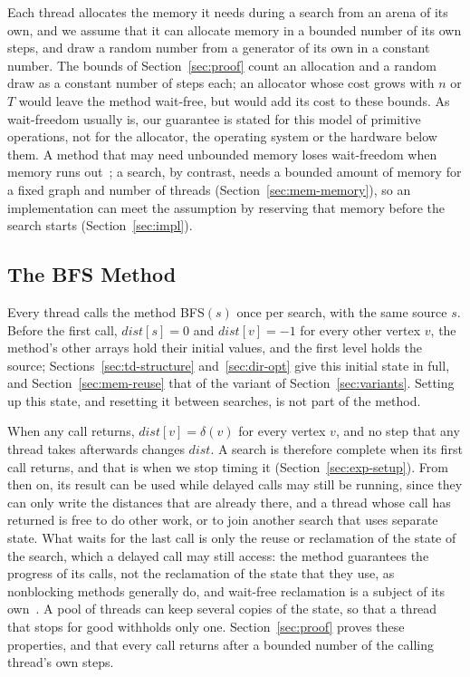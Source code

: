 Each thread allocates the memory it needs during a search from an arena of its own, and we assume that it can allocate memory in a bounded number of its own steps, and draw a random number from a generator of its own in a constant number. The bounds of Section~\ref{sec:proof} count an allocation and a random draw as a constant number of steps each; an allocator whose cost grows with $n$ or $T$ would leave the method wait-free, but would add its cost to these bounds. As wait-freedom usually is, our guarantee is stated for this model of primitive operations, not for the allocator, the operating system or the hardware below them. A method that may need unbounded memory loses wait-freedom when memory runs out~\cite{nikolaev_wcq}; a search, by contrast, needs a bounded amount of memory for a fixed graph and number of threads (Section~\ref{sec:mem-memory}), so an implementation can meet the assumption by reserving that memory before the search starts (Section~\ref{sec:impl}).

\subsection{The BFS Method}
\label{sec:bg-method}

Every thread calls the method \textsc{BFS}$(s)$ once per search, with the same source $s$. Before the first call, $\mathit{dist}[s] = 0$ and $\mathit{dist}[v] = -1$ for every other vertex $v$, the method's other arrays hold their initial values, and the first level holds the source; Sections~\ref{sec:td-structure} and~\ref{sec:dir-opt} give this initial state in full, and Section~\ref{sec:mem-reuse} that of the variant of Section~\ref{sec:variants}. Setting up this state, and resetting it between searches, is not part of the method.

When any call returns, $\mathit{dist}[v] = \delta(v)$ for every vertex $v$, and no step that any thread takes afterwards changes $\mathit{dist}$. A search is therefore complete when its first call returns, and that is when we stop timing it (Section~\ref{sec:exp-setup}). From then on, its result can be used while delayed calls may still be running, since they can only write the distances that are already there, and a thread whose call has returned is free to do other work, or to join another search that uses separate state. What waits for the last call is only the reuse or reclamation of the state of the search, which a delayed call may still access: the method guarantees the progress of its calls, not the reclamation of the state that they use, as nonblocking methods generally do, and wait-free reclamation is a subject of its own~\cite{nikolaev_crystalline}. A pool of threads can keep several copies of the state, so that a thread that stops for good withholds only one. Section~\ref{sec:proof} proves these properties, and that every call returns after a bounded number of the calling thread's own steps.
